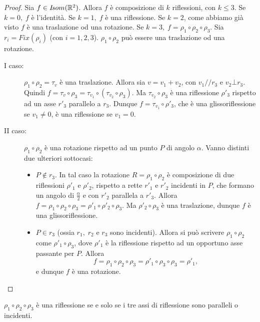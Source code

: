  \begin{proof}
 Sia $f\in I\!som( \mathbb R^2)$. Allora $f$ è composizione di $k$ riflessioni, con
 $k\le 3$.
 Se $k=0,\; f$ è l'identità.
 Se $k=1,\; f$ è una riflessione.
 Se $k=2$, come abbiamo già visto $f$ è una traslazione od una rotazione.
 Se $k=3,\; f=\rho_1\circ\rho_2\circ\rho_3$. Sia $r_i=Fix(\rho_i)$ (con $i=1,2,3$).
 $\rho_1\circ\rho_2$ può essere una traslazione od una rotazione.
 
 \begin{description}
 \item[I caso:] $\rho_1\circ\rho_2=\tau_v$ è una traslazione.
 Allora sia $v=v_1+v_2$, con $v_1//r_3$ e $v_2\bot r_3$.
 Quindi $f=\tau_v\circ\rho_3=\tau_{v_1}\circ(\tau_{v_2}\circ\rho_3)$. Ma $\tau_{v_2}\circ\rho_3$
 è una riflessione
 $\rho'_3$ rispetto ad un asse $r'_3$ parallelo a $r_3$.
 Dunque $f=\tau_{v_1}\circ\rho'_3$, che è una glissoriflessione se $v_1\ne 0$, è una riflessione se 
 $v_1=0$.
 
 \item[II caso:] $\rho_1\circ\rho_2$ è una rotazione rispetto ad un punto $P$ di angolo $\alpha$.
 Vanno distinti due ulteriori sottocasi:
 \begin{itemize}
  \item $P\notin r_3$. In tal caso la rotazione $R=\rho_1\circ\rho_2$ è composizione di due riflessioni
  $\rho'_1$
  e $\rho'_2$, rispetto a rette $r'_1$ e $r'_2$ incidenti in $P$,
  che formano un angolo di $\frac{\alpha}{2}$ e con $r'_2$ parallela a $r'_3$.
  Allora $f=\rho_1\circ\rho_2\circ\rho_3=\rho'_1\circ\rho'_2\circ\rho_3$. Ma
  $\rho'_2\circ\rho_3$
  è una traslazione, dunque $f$ è una glissoriflessione.
  \item $P\in r_3$ (ossia $r_1,\; r_2$ e $r_3$ sono incidenti). Allora si può scrivere
  $\rho_1\circ\rho_2$ come $\rho'_1\circ\rho_3$, dove $\rho'_1$ è la riflessione rispetto ad un
  opportuno asse passante per $P$.
  Allora $$f=\rho_1\circ\rho_2\circ\rho_3=\rho'_1\circ\rho_3\circ\rho_3=\rho'_1,$$ e dunque $f$ è una rotazione. 
 \end{itemize}
 
 \end{description}
 
 \end{proof}
  
 \begin{remark}
 $\rho_1\circ\rho_2\circ\rho_3$ è una riflessione se e solo se i tre assi di riflessione sono paralleli
 o incidenti.
 \end{remark}
 
